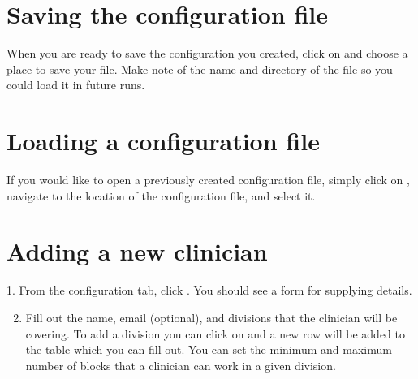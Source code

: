 \documentclass[letterpaper,10pt,english]{sphinxmanual}
\begin{document}
\section{Saving the configuration file}
\label{\detokenize{manual:saving-the-configuration-file}}
When you are ready to save the configuration you created, click on
 and choose a place to save your file. Make note of the name
and directory of the file so you could load it in future runs.

\begin{figure}[H]
\centering
{}\end{figure}


\section{Loading a configuration file}
\label{\detokenize{manual:loading-a-configuration-file}}
If you would like to open a previously created configuration file, simply
click on , navigate to the location of the configuration file,
and select it.

\begin{figure}[H]
\centering
{}\end{figure}


\section{Adding a new clinician}
\label{\detokenize{manual:adding-a-new-clinician}}\label{\detokenize{manual:id2}}
1. From the configuration tab, click . You should see a
form for supplying details.

\begin{figure}[H]
\centering
{}\end{figure}
\begin{enumerate}
\setcounter{enumi}{1}
\item {} 
Fill out the name, email (optional), and divisions that the clinician
will be covering. To add a division you can click on  and a new row
will be added to the table which you can fill out. You can set the minimum
and maximum number of blocks that a clinician can work in a given division.

\end{enumerate}
\end{document}
